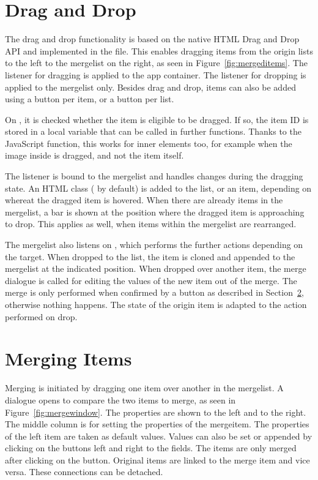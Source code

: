 \section{Drag and Drop}

The drag and drop functionality is based on the native HTML Drag and
Drop API \parencite{mdn-draganddrop} and implemented in the
 file. This enables dragging items from the origin
lists to the left to the mergelist on the right, as seen in
Figure~\ref{fig:mergeditems}. The listener for dragging is applied to
the app container. The listener for dropping is applied to the
mergelist only. Besides drag and drop, items can also be added using a
 button per item, or a  button per
list.

On , it is checked whether the item is eligible to be
dragged. If so, the item ID is stored in a local variable that can be
called in further functions. Thanks to the JavaScript 
function, this works for inner elements too, for example when the image
inside is dragged, and not the item itself.

The  listener is bound to the mergelist and handles
changes during the dragging state. An HTML class ( by
default) is added to the list, or an item, depending on whereat the
dragged item is hovered. When there are already items in the mergelist,
a bar is shown at the position where the dragged item is approaching to
drop. This applies as well, when items within the mergelist are
rearranged.

The mergelist also listens on , which performs the further
actions depending on the target. When dropped to the list, the item is
cloned and appended to the mergelist at the indicated position. When
dropped over another item, the merge dialogue is called for editing the
values of the new item out of the merge. The merge is only performed
when confirmed by a button as described in Section~\ref{sec:merging},
otherwise nothing happens. The state of the origin item is adapted to
the action performed on drop.




\section{Merging Items}
\label{sec:merging}

Merging is initiated by dragging one item over another in the mergelist.
A dialogue opens to compare the two items to merge, as seen in
Figure~\ref{fig:mergewindow}. The properties are shown to the left and
to the right. The middle column is for setting the properties of the
mergeitem. The properties of the left item are taken as default values.
Values can also be set or appended by clicking on the buttons left and
right to the fields. The items are only merged after clicking on the
 button. Original items are linked to the merge item and
vice versa. These connections can be detached.




